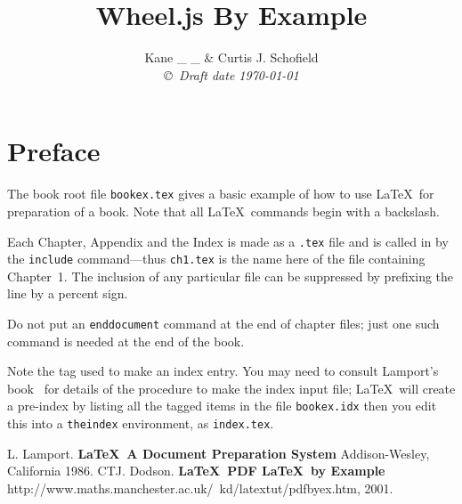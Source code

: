 \documentclass[16pt]{book}
\title{Wheel.js By Example  }
\author{Kane _ _ \& Curtis J. Schofield \\
{\small\em \copyright \  Draft date \today }}
\begin{document}
\tableofcontents
\chapter*{Preface}\normalsize
\pagestyle{plain}
The book root file {\tt bookex.tex} gives a basic example of how to
use \LaTeX \ for preparation of a book. Note that all
\LaTeX \ commands begin with a
backslash.

Each
Chapter, Appendix and the Index is made as a {\tt *.tex} file and is
called in by the {\tt include} command---thus {\tt ch1.tex} is
the name here of the file containing Chapter~1. The inclusion of any
particular file can be suppressed by prefixing the line by a
percent sign.


 Do not put an {\tt end{document}} command at the end of chapter files;
just one such command is needed at the end of the book.

Note the tag used to make an index entry. You may need to consult Lamport's
book~\cite{lamport} for details of the procedure to make the index input
file; \LaTeX \ will create a pre-index by listing all the tagged
items in the file {\tt bookex.idx} then you edit this into
a {\tt theindex} environment, as {\tt index.tex}.





\pagestyle{headings}







\begin{thebibliography}{99}
 L. Lamport. {\bf \LaTeX \ A Document Preparation System}
Addison-Wesley, California 1986.
 CTJ. Dodson. {\bf \LaTeX \ PDF \LaTeX \ by Example}
http://www.maths.manchester.ac.uk/~kd/latextut/pdfbyex.htm, 2001.
\end{thebibliography}
\end{document}
